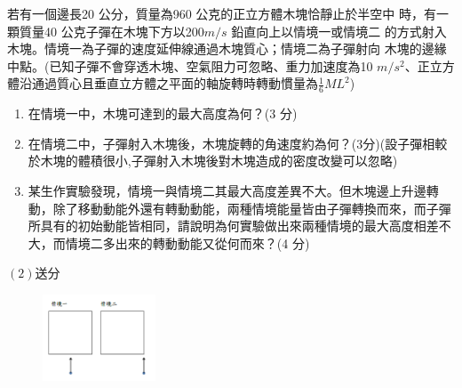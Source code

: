 \documentclass[cn,10pt,math=newtx,chinesefont=founder,device=ig]{elegantbook}
\begin{document}
\begin{example}
   若有一個邊長20 公分，質量為960 公克的正立方體木塊恰靜止於半空中
時，有一顆質量40 公克子彈在木塊下方以200$m/s$ 鉛直向上以情境一或情境二
的方式射入木塊。情境一為子彈的速度延伸線通過木塊質心；情境二為子彈射向
木塊的邊緣中點。(已知子彈不會穿透木塊、空氣阻力可忽略、重力加速度為10
$m/s^2$、正立方體沿通過質心且垂直立方體之平面的軸旋轉時轉動慣量為$\frac{1}{6} ML^2$)
\begin{enumerate}[label=(\arabic*)] 
  \item 在情境一中，木塊可達到的最大高度為何？(3 分)
  \item 在情境二中，子彈射入木塊後，木塊旋轉的角速度約為何？(3分)(設子彈相較於木塊的體積很小,子彈射入木塊後對木塊造成的密度改變可以忽略)
  \item 某生作實驗發現，情境一與情境二其最大高度差異不大。但木塊邊上升邊轉動，除了移動動能外還有轉動動能，兩種情境能量皆由子彈轉換而來，而子彈所具有的初始動能皆相同，請說明為何實驗做出來兩種情境的最大高度相差不大，而情境二多出來的轉動動能又從何而來？(4 分)
    \end{enumerate}


    \rightline{[台中女中教甄109]}
\end{example}
\begin{solution}
    $(2)送分$
\end{solution}
\begin{figure}[htbp]
    \flushright
    \includegraphics[width=0.3\textwidth]{image/109中女23.png}
  \end{figure}
\newpage
\end{document}
